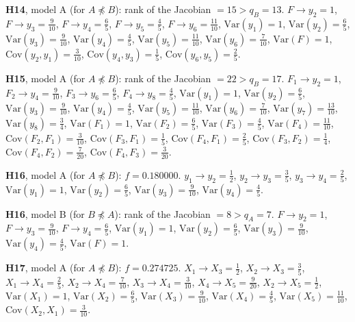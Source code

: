 \documentclass[10pt,a4paper]{article}
\newcommand{\nnest}{\not\preceq}
\begin{document}
{\noindent\textbf{H14}, model A (for $A\nnest B$): rank of the Jacobian $=15>q_B=13$. {\footnotesize $F\to y_{2}=1$, $F\to y_{3}=\tfrac{9}{10}$, $F\to y_{4}=\tfrac{6}{5}$, $F\to y_{5}=\tfrac{4}{5}$, $F\to y_{6}=\tfrac{11}{10}$, $\mathrm{Var}(y_{1})=1$, $\mathrm{Var}(y_{2})=\tfrac{6}{5}$, $\mathrm{Var}(y_{3})=\tfrac{9}{10}$, $\mathrm{Var}(y_{4})=\tfrac{4}{5}$, $\mathrm{Var}(y_{5})=\tfrac{11}{10}$, $\mathrm{Var}(y_{6})=\tfrac{7}{10}$, $\mathrm{Var}(F)=1$, $\mathrm{Cov}(y_{2},y_{1})=\tfrac{3}{10}$, $\mathrm{Cov}(y_{4},y_{3})=\tfrac{1}{5}$, $\mathrm{Cov}(y_{6},y_{5})=\tfrac{2}{5}$.}\par\smallskip
\noindent\textbf{H15}, model A (for $A\nnest B$): rank of the Jacobian $=22>q_B=17$. {\footnotesize $F_{1}\to y_{2}=1$, $F_{2}\to y_{4}=\tfrac{9}{10}$, $F_{3}\to y_{6}=\tfrac{6}{5}$, $F_{4}\to y_{8}=\tfrac{4}{5}$, $\mathrm{Var}(y_{1})=1$, $\mathrm{Var}(y_{2})=\tfrac{6}{5}$, $\mathrm{Var}(y_{3})=\tfrac{9}{10}$, $\mathrm{Var}(y_{4})=\tfrac{4}{5}$, $\mathrm{Var}(y_{5})=\tfrac{11}{10}$, $\mathrm{Var}(y_{6})=\tfrac{7}{10}$, $\mathrm{Var}(y_{7})=\tfrac{13}{10}$, $\mathrm{Var}(y_{8})=\tfrac{3}{4}$, $\mathrm{Var}(F_{1})=1$, $\mathrm{Var}(F_{2})=\tfrac{6}{5}$, $\mathrm{Var}(F_{3})=\tfrac{4}{5}$, $\mathrm{Var}(F_{4})=\tfrac{11}{10}$, $\mathrm{Cov}(F_{2},F_{1})=\tfrac{3}{10}$, $\mathrm{Cov}(F_{3},F_{1})=\tfrac{1}{5}$, $\mathrm{Cov}(F_{4},F_{1})=\tfrac{2}{5}$, $\mathrm{Cov}(F_{3},F_{2})=\tfrac{1}{4}$, $\mathrm{Cov}(F_{4},F_{2})=\tfrac{7}{20}$, $\mathrm{Cov}(F_{4},F_{3})=\tfrac{3}{20}$.}\par\smallskip
\noindent\textbf{H16}, model A (for $A\nnest B$): $f=0.180000$. {\footnotesize $y_{1}\to y_{2}=\tfrac{1}{2}$, $y_{2}\to y_{3}=\tfrac{3}{5}$, $y_{3}\to y_{4}=\tfrac{2}{5}$, $\mathrm{Var}(y_{1})=1$, $\mathrm{Var}(y_{2})=\tfrac{6}{5}$, $\mathrm{Var}(y_{3})=\tfrac{9}{10}$, $\mathrm{Var}(y_{4})=\tfrac{4}{5}$.}\par\smallskip
\noindent\textbf{H16}, model B (for $B\nnest A$): rank of the Jacobian $=8>q_A=7$. {\footnotesize $F\to y_{2}=1$, $F\to y_{3}=\tfrac{9}{10}$, $F\to y_{4}=\tfrac{6}{5}$, $\mathrm{Var}(y_{1})=1$, $\mathrm{Var}(y_{2})=\tfrac{6}{5}$, $\mathrm{Var}(y_{3})=\tfrac{9}{10}$, $\mathrm{Var}(y_{4})=\tfrac{4}{5}$, $\mathrm{Var}(F)=1$.}\par\smallskip
\noindent\textbf{H17}, model A (for $A\nnest B$): $f=0.274725$. {\footnotesize $X_{1}\to X_{3}=\tfrac{1}{2}$, $X_{2}\to X_{3}=\tfrac{3}{5}$, $X_{1}\to X_{4}=\tfrac{2}{5}$, $X_{2}\to X_{4}=\tfrac{7}{10}$, $X_{3}\to X_{4}=\tfrac{3}{10}$, $X_{4}\to X_{5}=\tfrac{9}{20}$, $X_{2}\to X_{5}=\tfrac{1}{2}$, $\mathrm{Var}(X_{1})=1$, $\mathrm{Var}(X_{2})=\tfrac{6}{5}$, $\mathrm{Var}(X_{3})=\tfrac{9}{10}$, $\mathrm{Var}(X_{4})=\tfrac{4}{5}$, $\mathrm{Var}(X_{5})=\tfrac{11}{10}$, $\mathrm{Cov}(X_{2},X_{1})=\tfrac{3}{10}$.}\par\smallskip
}
\end{document}
